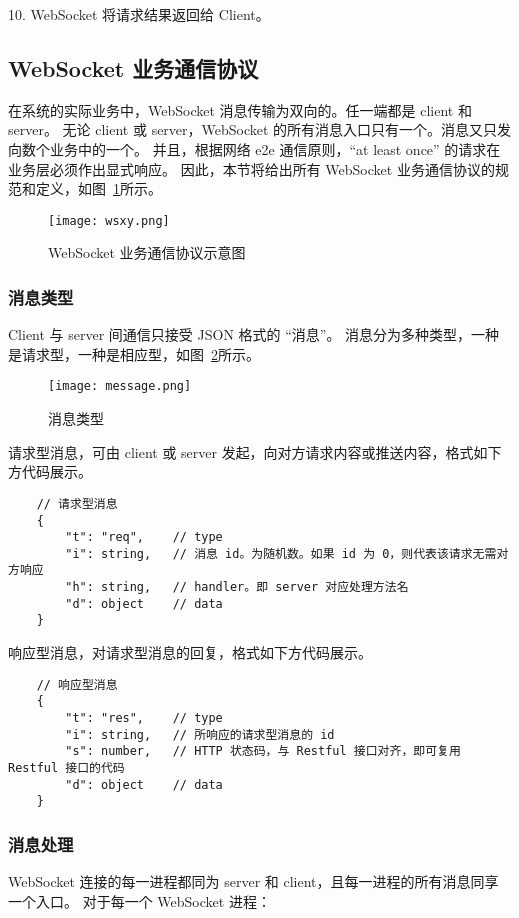 10. WebSocket 将请求结果返回给 Client。

  \subsection{WebSocket 业务通信协议}
  在系统的实际业务中，WebSocket 消息传输为双向的。任一端都是 client 和 server。
无论 client 或 server，WebSocket 的所有消息入口只有一个。消息又只发向数个业务中的一个。
并且，根据网络 e2e 通信原则，“at least once” 的请求在业务层必须作出显式响应。
因此，本节将给出所有 WebSocket 业务通信协议的规范和定义，如图~\ref{fig:wsxy}所示。

\begin{figure}[!htp]
    \centering
    \texttt{[image: wsxy.png]}
    \caption{WebSocket 业务通信协议示意图}
    \label{fig:wsxy}
  \end{figure}

  \subsubsection{消息类型}
  Client 与 server 间通信只接受 JSON 格式的 “消息”。
  消息分为多种类型，一种是请求型，一种是相应型，如图~\ref{fig:messageType}所示。
  
  \begin{figure}[!htp]
    \centering
    \texttt{[image: message.png]}
    \caption{消息类型}
    \label{fig:messageType}
  \end{figure}

  请求型消息，可由 client 或 server 发起，向对方请求内容或推送内容，格式如下方代码展示。
  {\setmainfont{Courier New Bold}
\begin{lstlisting}
    // 请求型消息
    {
        "t": "req",    // type
        "i": string,   // 消息 id。为随机数。如果 id 为 0，则代表该请求无需对方响应
        "h": string,   // handler。即 server 对应处理方法名
        "d": object    // data
    }
 \end{lstlisting}}

 响应型消息，对请求型消息的回复，格式如下方代码展示。
 {\setmainfont{Courier New Bold}
 \begin{lstlisting}
    // 响应型消息
    {
        "t": "res",    // type
        "i": string,   // 所响应的请求型消息的 id
        "s": number,   // HTTP 状态码，与 Restful 接口对齐，即可复用 Restful 接口的代码
        "d": object    // data
    }
  \end{lstlisting}}

  \subsubsection{消息处理}
  WebSocket 连接的每一进程都同为 server 和 client，且每一进程的所有消息同享一个入口。
对于每一个 WebSocket 进程：

